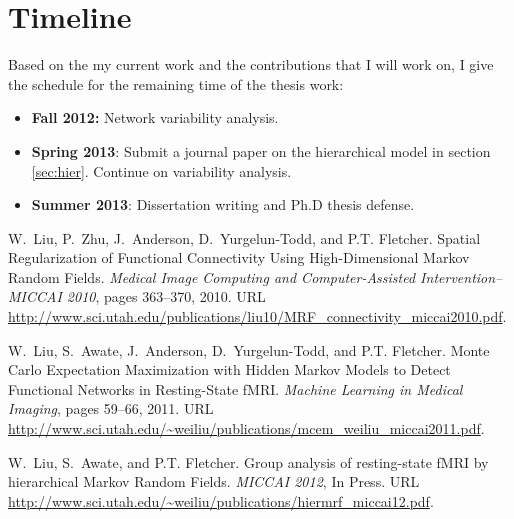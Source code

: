 \documentclass[12pt]{article}
\begin{document}
\section{Timeline} 
Based on the my current work and the contributions that I will work on, I give
the schedule for the remaining time of the thesis work:
\begin{itemize}
  \item \textbf{Fall 2012:} Network variability analysis.
  \item \textbf{Spring 2013}: Submit a journal paper on the hierarchical model
    in section \ref{sec:hier}. Continue on variability analysis.
  \item \textbf{Summer 2013}: Dissertation writing and Ph.D thesis defense.
\end{itemize}





\appendix
\renewcommand{\refname}{List of Publications}
\begin{thebibliography}{1}

W.~Liu, P.~Zhu, J.~Anderson, D.~Yurgelun-Todd, and P.T. Fletcher.
\newblock Spatial {R}egularization of {F}unctional {C}onnectivity {U}sing
  {H}igh-{D}imensional {M}arkov {R}andom {F}ields.
\newblock \emph{Medical Image Computing and Computer-Assisted
  Intervention--MICCAI 2010}, pages 363--370, 2010.
\newblock URL
  \url{http://www.sci.utah.edu/publications/liu10/MRF_connectivity_miccai2010.pdf}.

W.~Liu, S.~Awate, J.~Anderson, D.~Yurgelun-Todd, and P.T. Fletcher.
\newblock Monte {C}arlo {E}xpectation {M}aximization with {H}idden {M}arkov
  {M}odels to {D}etect {F}unctional {N}etworks in {R}esting-{S}tate {fMRI}.
\newblock \emph{Machine Learning in Medical Imaging}, pages 59--66, 2011.
\newblock URL
  \url{http://www.sci.utah.edu/~weiliu/publications/mcem_weiliu_miccai2011.pdf}.

W.~Liu, S.~Awate, and P.T. Fletcher.
\newblock Group analysis of resting-state {fMRI} by hierarchical {M}arkov
  {R}andom {F}ields.
\newblock \emph{MICCAI 2012}, In Press.
\newblock URL
  \url{http://www.sci.utah.edu/~weiliu/publications/hiermrf_miccai12.pdf}.

\end{thebibliography}
\end{document}
